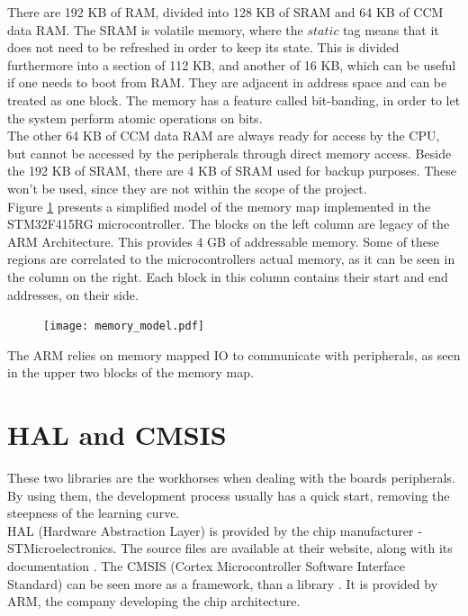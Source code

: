 There are 192 KB of RAM, divided into 128 KB of SRAM and 64 KB of
CCM data RAM.
The SRAM is volatile memory, where the $static$ tag means
that it does not need to be refreshed in order to
keep its state. This is divided furthermore into a section of 112 KB, and
another of 16 KB, which can be useful if one needs to boot from RAM\cite{run_from_ram}.
They are adjacent in address space and can be treated as one block.
The memory has a feature called bit-banding, in order to let the system
perform atomic operations on bits\cite{bit_banding}.\\

The other 64 KB of CCM data RAM are always ready for access by the CPU,
but cannot be accessed by the peripherals through direct memory access.
Beside the 192 KB of SRAM, there are 4 KB of SRAM used for backup purposes.
These won't be used, since they are not within the scope of the project.\\

Figure \ref{fig:memory_model} presents a simplified model of the
memory map implemented in the STM32F415RG microcontroller\cite{stm32_datasheet_74}.
The blocks on the left column are legacy of the ARM Architecture.
This provides 4 GB of addressable memory.
Some of these regions are correlated to the microcontroller\textquotesingle s
actual memory, as it can be seen in the column on the right. Each block
in this column contains their start and end addresses, on their side.

\begin{figure}[H]
\centering
\texttt{[image: memory\_model.pdf]}
\label{fig:memory_model}
\end{figure}

The ARM relies on memory mapped IO to communicate with peripherals,
as seen in the upper two blocks of the memory map.

\section{HAL and CMSIS}
These two libraries are the workhorses when dealing with the
board\textquotesingle s peripherals. By using them, the development
process usually has a quick start, removing the steepness of the
learning curve.\\
HAL (Hardware Abstraction Layer) is provided by the chip manufacturer - STMicroelectronics.
The source files are available at their website,
along with its documentation \cite{HAL_library}.
The CMSIS (Cortex Microcontroller Software Interface Standard)
can be seen more as a framework, than a library
 \cite{CMSIS_core_library}. It is provided
by ARM, the company developing the chip architecture.\\

